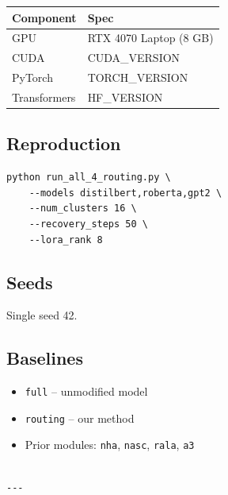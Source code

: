 \begin{table}[H]
\centering
\small
\begin{tabular}{ll}
\toprule
\textbf{Component} & \textbf{Spec} \\
\midrule
GPU & RTX 4070 Laptop (8 GB) \\
CUDA & {{CUDA\_VERSION}} \\
PyTorch & {{TORCH\_VERSION}} \\
Transformers & {{HF\_VERSION}} \\
\bottomrule
\end{tabular}
\end{table}

\subsection{Reproduction}

\begin{lstlisting}
python run_all_4_routing.py \
    --models distilbert,roberta,gpt2 \
    --num_clusters 16 \
    --recovery_steps 50 \
    --lora_rank 8
\end{lstlisting}

\subsection{Seeds}

Single seed 42.

\subsection{Baselines}

\begin{itemize}
\item \texttt{full} -- unmodified model
\item \texttt{routing} -- our method
\item Prior modules: \texttt{nha}, \texttt{nasc}, \texttt{rala}, \texttt{a3}
\end{itemize}
\begin{lstlisting}

---
\end{lstlisting}